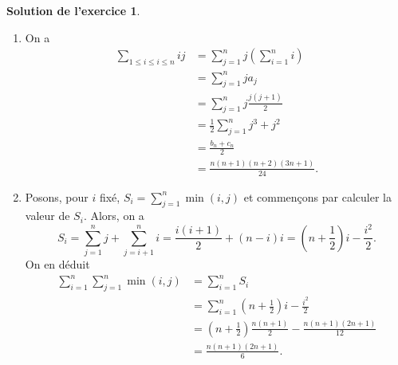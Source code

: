 \documentclass[a4paper, 11pt,openany]{article}%
\theoremstyle{plain}
\theoremstyle{definition}
\newtheorem{sol}{Solution de l'exercice}
\theoremstyle{remark}
\begin{document}
   
\begin{sol}
\begin{enumerate}
	\item On a
	\[
		\begin{aligned}
			\sum_{1\leqslant i \leqslant i \leqslant n} ij 
			&= \sum_{j=1}^n j\left(\sum_{i = 1}^n i\right) \\
			&=  \sum_{j=1}^n ja_j \\
			&=  \sum_{j=1}^n j\frac{j(j+1)}{2} \\
			&= \frac 12 \sum_{j=1}^n j^3 +j^2 \\
			&= \frac{b_n+c_n}{2}\\
			&= \frac{n(n+1)(n+2)(3n+1)}{24}.
		\end{aligned}
	\]
	 \item Posons, pour $i$ fixé, $S_i = \sum_{j=1}^n \min(i,j)$ et commençons par calculer la valeur de $S_i$. Alors, on a
	 \[ S_i = \sum_{j=1}^n j + \sum_{j=i+1}^n i = \frac{i(i+1)}{2} + (n-i)i = \left( n + \frac{1}{2} \right)i - \frac{i^2}{2}.\]
	 On en déduit
	\[
		\begin{aligned}
			 \sum_{i=1}^n \sum_{j=1}^n \min(i,j)
			&= \sum_{i=1}^n S_i \\
			&=  \sum_{i=1}^n \left( n + \frac{1}{2} \right)i - \frac{i^2}{2} \\
			&=  \left( n + \frac{1}{2} \right)\frac{n(n+1)}{2} - \frac{n(n+1)(2n+1)}{12} \\
			&= \frac{n(n+1)(2n+1)}{6}.
		\end{aligned}
	\]
\end{enumerate}
\end{sol}
\end{document}
